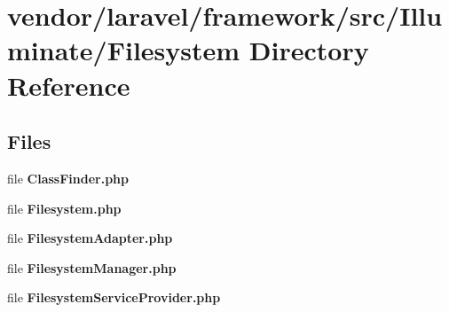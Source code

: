 \section{vendor/laravel/framework/src/\+Illuminate/\+Filesystem Directory Reference}
\label{dir_421b3734cd3b028e8ed6f407439ad0e2}
\subsection*{Files}
\begin{DoxyCompactItemize}
\item 
file {\bf Class\+Finder.\+php}
\item 
file {\bf Filesystem.\+php}
\item 
file {\bf Filesystem\+Adapter.\+php}
\item 
file {\bf Filesystem\+Manager.\+php}
\item 
file {\bf Filesystem\+Service\+Provider.\+php}
\end{DoxyCompactItemize}
